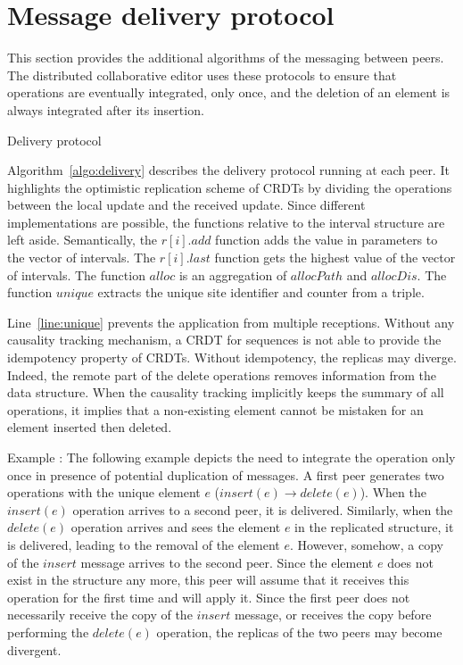 
\section{Message delivery protocol}
\label{sec:messagedelivery}
This section provides the additional algorithms of the messaging between
peers. The distributed collaborative editor \EDITORNAME{} uses these protocols
to ensure that operations are eventually integrated, only once, and the
deletion of an element is always integrated after its insertion.

\begin{algorithm}[h]
  
  \caption{\label{algo:delivery}Delivery protocol}
\end{algorithm}

Algorithm~\ref{algo:delivery} describes the delivery protocol running at each
peer. It highlights the optimistic replication scheme of CRDTs by dividing the
operations between the local update and the received update.  Since different
implementations are possible, the functions relative to the interval structure
are left aside. Semantically, the $r[i].add$ function adds the value in
parameters to the vector of intervals. The $r[i].last$ function gets the
highest value of the vector of intervals. The function $alloc$ is an
aggregation of $allocPath$ and $allocDis$. The function $unique$ extracts the
unique site identifier and counter from a triple.

Line~\ref{line:unique} prevents the application from multiple
receptions. Without any causality tracking mechanism, a CRDT for sequences is
not able to provide the idempotency property of CRDTs. Without idempotency, the
replicas may diverge. Indeed, the remote part of the delete operations removes
information from the data structure. When the causality tracking implicitly
keeps the summary of all operations, it implies that a non-existing element
cannot be mistaken for an element inserted then deleted.

\begin{asparadesc}
\item[Example \EXAMPLE{}:] The following example depicts the need to integrate
  the operation only once in presence of potential duplication of messages. A
  first peer generates two operations with the unique element $e$ ($insert(e)
  \rightarrow delete(e)$). When the $insert(e)$ operation arrives to a second
  peer, it is delivered. Similarly, when the $delete(e)$ operation arrives and
  sees the element $e$ in the replicated structure, it is delivered, leading to
  the removal of the element $e$. However, somehow, a copy of the $insert$
  message arrives to the second peer. Since the element $e$ does not exist in
  the structure any more, this peer will assume that it receives this operation
  for the first time and will apply it. Since the first peer does not
  necessarily receive the copy of the $insert$ message, or receives the copy
  before performing the $delete(e)$ operation, the replicas of the two peers
  may become divergent.
\end{asparadesc}


